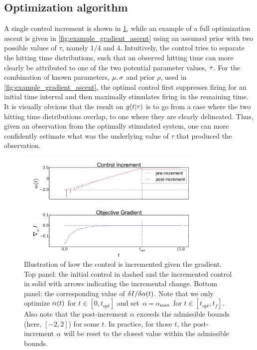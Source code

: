 \subsection{Optimization algorithm}
A single control increment is shown in \cref{fig:example_control_increment},
while an example of a full optimization ascent is given in
\cref{fig:example_gradient_ascent} using an assumed prior with two possible
values of $\tau$, namely $1/4$ and $4$.
 Intuitively, the control tries to separate the hitting time distributions, such
 that an observed hitting time can more clearly be attributed to one of the two potential parameter values, ${\tau}$.
For the combination of known parameters, ${\mu }, \sigma$ and prior $\rho$, used in
\cref{fig:example_gradient_ascent}, the optimal control first suppresses firing
for an initial time interval and then maximally stimulates firing in the
remaining time. It is visually obvious that the result on $g(t|{ \tau })$ is to go
from a case where the two hitting time distributions overlap, to one where they
are clearly delineated. Thus, given an observation from the optimally stimulated
system, one can more confidently estimate what was the underlying value of
$\tau$ that produced the observation.
\begin{figure}[htp]
\begin{center}
  \includegraphics[width=0.8\textwidth]{Figs/FP_Adjoint/control_increment_example.pdf}
  \caption[Single control-increment illustration]{Illustration of how the
  control is incremented given the gradient. Top panel: the
  initial control in dashed and the incremented control in solid with arrows
  indicating the incremental change. Bottom panel: the
  corresponding value of $\delta I/ \delta \alpha (t)$.
  Note that we only optimize $\alpha(t)$ for $t \in [0, t_{opt}]$ and set $\alpha={ \alpha_{\textrm{max}} }$
  for $t \in [t_{opt}, t_f]$. Also note that the post-increment $\alpha$ exceeds
  the admissible bounds (here, $[-2,2]$) for some $t$. In practice, for those
  $t$, the post-increment $\alpha$ will be reset to the closest value within the
  admissible bounds.}
  \label{fig:example_control_increment}    
\end{center}
\end{figure}
           
